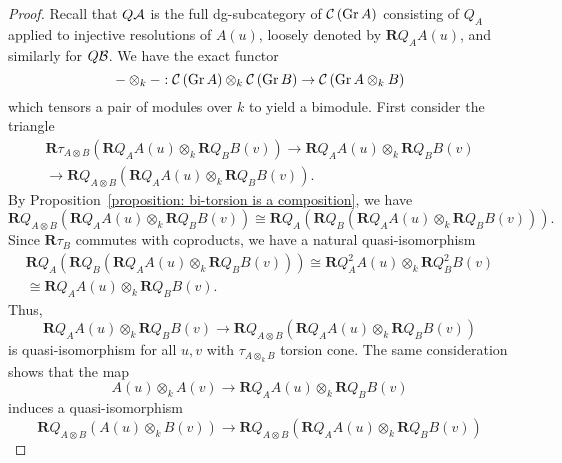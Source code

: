 \begin{proof}
  Recall that \(Q \mathcal{A}\) is the full dg-subcategory of \(\mathcal{C}\left(\operatorname{Gr}A\right)\) consisting of \(Q_{A}\) applied to injective resolutions of \(A(u)\), loosely denoted by \(\mathbf{R}Q_A A(u)\), and similarly for \(Q \mathcal{B}\). We have the exact functor
  \begin{displaymath}
    - \otimes_k - : \mathcal{C}\left(\operatorname{Gr}A\right) \otimes_k \mathcal{C}\left(\operatorname{Gr}B\right) \to \mathcal{C}\left(\operatorname{Gr}A \otimes_k B\right)
  \end{displaymath}
  which tensors a pair of modules over \(k\) to yield a bimodule. First consider the triangle
  \begin{gather*}
    \mathbf{R}\tau_{A \otimes B} (\mathbf{R} Q_A A(u) \otimes_k \mathbf{R} Q_B B(v) ) \to \mathbf{R} Q_A A(u) \otimes_k \mathbf{R} Q_B B(v) \\ \to \mathbf{R}Q_{A \otimes B} (\mathbf{R} Q_A A(u) \otimes_k \mathbf{R} Q_B B(v) ).
  \end{gather*}
  By Proposition~\ref{proposition: bi-torsion is a composition}, we have 
  \begin{displaymath}
    \mathbf{R}Q_{A \otimes B} (\mathbf{R} Q_A A(u) \otimes_k \mathbf{R} Q_B B(v) ) \cong \mathbf{R} Q_A \left( \mathbf{R}Q_B \left( \mathbf{R} Q_A A(u) \otimes_k \mathbf{R} Q_B B(v) \right) \right).
  \end{displaymath}
  Since \(\mathbf{R}\tau_B\) commutes with coproducts, we have a natural quasi-isomorphism
  \begin{gather*}
    \mathbf{R} Q_A \left( \mathbf{R}Q_B \left( \mathbf{R} Q_A A(u) \otimes_k \mathbf{R} Q_B B(v) \right) \right) \cong \mathbf{R}Q_A^2 A(u) \otimes_k \mathbf{R}Q_B^2 B(v) \\ \cong \mathbf{R}Q_A A(u) \otimes_k \mathbf{R}Q_B B(v). 
  \end{gather*}
  Thus, 
  \begin{displaymath}
    \mathbf{R} Q_A A(u) \otimes_k \mathbf{R} Q_B B(v) \to \mathbf{R}Q_{A \otimes B} (\mathbf{R} Q_A A(u) \otimes_k \mathbf{R} Q_B B(v) )
  \end{displaymath}
  is quasi-isomorphism for all \(u,v\) with \(\tau_{A \otimes_k B}\) torsion cone. The same consideration shows that the map 
  \begin{displaymath}
    A(u) \otimes_k A(v) \to \mathbf{R} Q_A A(u) \otimes_k \mathbf{R} Q_B B(v)
  \end{displaymath}
  induces a quasi-isomorphism
  \begin{displaymath}
    \mathbf{R}Q_{A \otimes B}( A(u) \otimes_k B(v) ) \to \mathbf{R}Q_{A \otimes B} (\mathbf{R} Q_A A(u) \otimes_k \mathbf{R} Q_B B(v) )

\end{displaymath}
\end{proof}
